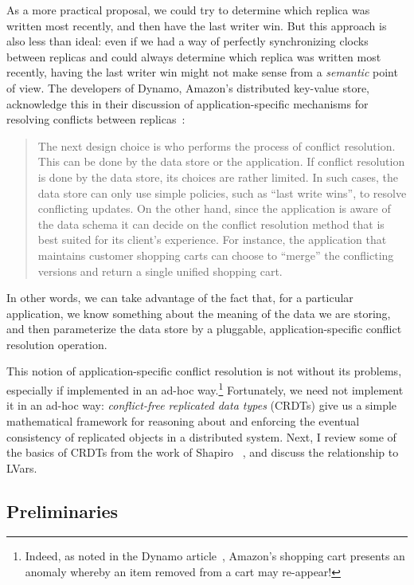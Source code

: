 \documentclass{article}
\begin{document}
As a more practical proposal, we could try to determine which replica
was written most recently, and then have the last writer win.  But
this approach is also less than ideal: even if we had a way of
perfectly synchronizing clocks between replicas and could always
determine which replica was written most recently, having the last
writer win might not make sense from a \emph{semantic} point of view.
The developers of Dynamo, Amazon's distributed key-value store,
acknowledge this in their discussion of application-specific
mechanisms for resolving conflicts between replicas~\cite{dynamo}:
\begin{quote}
  The next design choice is who performs the process of conflict
  resolution. This can be done by the data store or the
  application. If conflict resolution is done by the data store, its
  choices are rather limited. In such cases, the data store can only
  use simple policies, such as ``last write wins'', to resolve
  conflicting updates. On the other hand, since the application is
  aware of the data schema it can decide on the conflict resolution
  method that is best suited for its client’s experience. For
  instance, the application that maintains customer shopping carts can
  choose to ``merge'' the conflicting versions and return a single
  unified shopping cart.
\end{quote}
In other words, we can take advantage of the fact that, for a
particular application, we know something about the meaning of the
data we are storing, and then parameterize the data store by a
pluggable, application-specific conflict resolution operation.

This notion of application-specific conflict resolution is not without
its problems, especially if implemented in an ad-hoc
way.\footnote{Indeed, as noted in the Dynamo article~\cite{dynamo},
  Amazon's shopping cart presents an anomaly whereby an item removed
  from a cart may re-appear!}  Fortunately, we need not implement it
in an ad-hoc way: \emph{conflict-free replicated data types} (CRDTs)
give us a simple mathematical framework for reasoning about and
enforcing the eventual consistency of replicated objects in a
distributed system.  Next, I review some of the basics of CRDTs from
the work of Shapiro \etal~\cite{crdts, crdts-tr}, and discuss the
relationship to LVars.

\subsection{Preliminaries}
\end{document}
